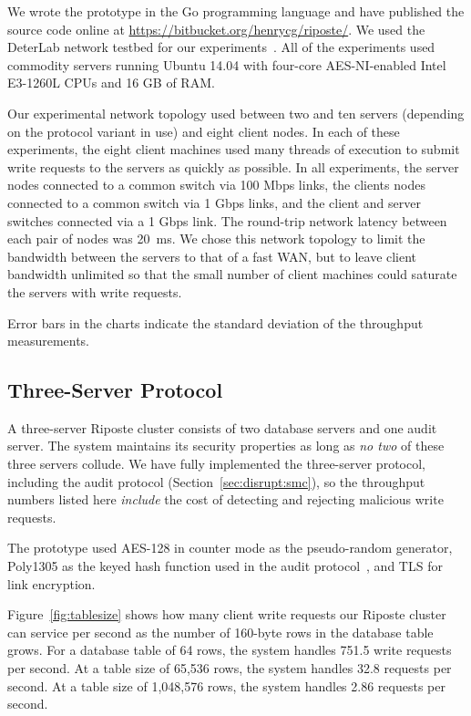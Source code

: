 \documentclass[10pt,twocolumn]{article}
\newcommand{\name}{Riposte\xspace}
\begin{document}
We wrote the prototype in the Go programming language
and have published the source code online at
\url{https://bitbucket.org/henrycg/riposte/}.
We used the DeterLab network 
testbed for our experiments~\cite{mirkovic2012teaching}.
All of the experiments used commodity servers running Ubuntu 14.04
with four-core AES-NI-enabled Intel E3-1260L CPUs 
and 16 GB of RAM.

Our experimental network topology used between
two and ten servers (depending on the protocol variant in use)
and eight client nodes.
In each of these experiments, the eight client machines
used many threads of execution to submit
write requests to the servers as quickly as possible.
In all experiments, the server nodes
connected to a common switch via 100 Mbps links,
the clients nodes connected to a common switch via 1 Gbps links,
and the client and server switches connected via a 1 Gbps link.
The round-trip network latency between each pair of nodes was 20~ms.
We chose this network topology to limit
the bandwidth between the servers to that of a fast WAN, but
to leave client bandwidth unlimited so that the small number
of client machines could saturate the servers with
write requests.

Error bars in the charts indicate the standard
deviation of the throughput measurements.

\subsection{Three-Server Protocol}

A three-server \name cluster consists of
two database servers and one audit server.
The system maintains its security properties as long
as {\em no two} of these three servers collude.
We have fully implemented the three-server protocol,
including the audit protocol (Section~\ref{sec:disrupt:smc}),
so the throughput numbers listed here {\em include} 
the cost of detecting and rejecting malicious write requests.

The prototype used AES-128 in counter mode as the pseudo-random
generator, Poly1305 as the keyed hash function 
used in the audit protocol~\cite{bernstein2005poly},
and TLS for link encryption.

Figure~\ref{fig:tablesize} shows how many client write requests
our \name cluster can service per second as the number of 160-byte
rows in the database table grows.
For a database table of 64 rows, the system handles 
751.5 write requests per second.
At a table size of 65,536 rows, the system handles 32.8 requests
per second.
At a table size of 1,048,576 rows, the system handles 2.86 requests
per second.
\end{document}
